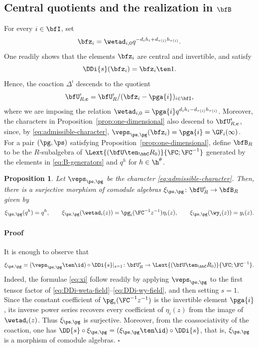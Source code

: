 \documentclass[reqno]{amsart}
\numberwithin{equation}{section}
\newtheorem*{proposition}{Proposition}
\newenvironment{pf}{\medskip\paragraph{{\sc Proof}}}{\hfill$\square$\par\medskip}
\begin{document}
\subsection{Central quotients and the realization in $\bfB$}\label{ss:central-specializations}
For every $i\in\bfI$, set
\begin{equation}\label{eq:central-zero-modes}
\bfz_i=\wetad_{i,0}q^{-d_ih_i+d_{\tau(i)}h_{\tau(i)}}.
\end{equation}
One readily shows that the elements $\bfz_i$ are central and invertible, and
satisfy
\begin{equation}\label{eq:central-coinvariance}
	\DDi{s}(\bfz_i)=\bfz_i\ten1.
\end{equation}	
Hence, the coaction $\Delta^\imath$ descends to the quotient
\begin{equation}\label{eq:central-quotient}
\bfU^\imath_{R,\mathbf c}
=\bfU^\imath_R/(\bfz_i-\pga{i})_{i\in\bfI},
\end{equation}
where we are imposing the relation $\wetad_{i,0}=\pga{i}q^{d_ih_i-d_{\tau(i)}h_{\tau(i)}}$.
Moreover, the characters in Proposition~\ref{prop:one-dimensional} also descend
to $\bfU^\imath_{R,\mathbf c}$, since, by \eqref{eq:admissible-character},
$\veps_{\ps,\pg}(\bfz_i)=\pga{i}=\GF_i(\infty)$.\\

For a pair $(\pg,\ps)$ satisfying Proposition~\ref{prop:one-dimensional},
define $\bfB_R$ to be the $R$-subalgebra of
$\Lext{(\bfU\ten_{\bbC} R_0)}{\FC;\FC^{-1}}$ generated by the elements
in \eqref{eq:B-generators} and $q^h$ for $h\in\h^{\theta}$.

\begin{proposition}\label{prop:central-realization}
Let $\veps_{\ps,\pg}$ be the character \eqref{eq:admissible-character}.
Then, there is a surjective morphism of comodule algebras $\xi_{\ps,\pg}\colon\bfU^\imath_R\to\bfB_R$
given by
\begin{equation}\label{eq:xi}
\xi_{\ps,\pg}(q^h)=q^h,\qquad
\xi_{\ps,\pg}(\wetad_i(z))=\pg_i(\FC^{-1}z^{-1})\eta_i(z),
\qquad
\xi_{\ps,\pg}(\wy_i(z))=y_i(z).
\end{equation}
\end{proposition}

\begin{pf}
It is enough to observe that
\begin{equation}\label{eq:morphism-xi}
	\xi_{\ps,\pg}=(\veps_{\ps,\pg}\ten\id)\circ\DDi{s}\vert_{s=1}\colon \bfU^\imath_R\to\Lext{(\bfU\ten_{\bbC} R_0)}{\FC;\FC^{-1}}.
\end{equation} 
Indeed, the formulae \eqref{eq:xi} follow readily by applying $\veps_{\ps,\pg}$ to the first tensor
factor of \eqref{eq:DDi-weta-field}--\eqref{eq:DDi-wy-field}, and then setting
$s=1$.
Since the constant coefficient of $\pg_i(\FC^{-1}z^{-1})$ is the invertible element $\pga{i}$, its inverse power series recovers every coefficient of
$\eta_i(z)$ from the image of $\wetad_i(z)$. Thus $\xi_{\ps,\pg}$ is surjective.
Moreover, from the coassociativity of the coaction, one has
$\DD{s}\circ\xi_{\ps,\pg}=(\xi_{\ps,\pg}\ten\id)\circ\DDi{s}$, that is, $\xi_{\ps,\pg}$
is a morphism of comodule algebras. 
\end{pf}
\end{document}

